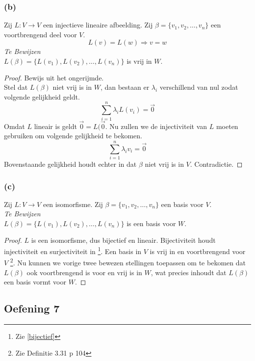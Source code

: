 \documentclass[lineaire_algebra_oplossingen.tex]{subfiles}
\begin{document}
\subsubsection*{(b)}
Zij $L: V \rightarrow V$ een injectieve lineaire afbeelding. Zij $\beta = \{v_1,v_2,\ldots,v_n\}$ een voortbrengend deel voor $V$.
\[
L(v) = L(w) \Rightarrow v = w
\]
\emph{Te Bewijzen}\\
$L(\beta) = \{L(v_1),L(v_2),\ldots,L(v_n)\}$ is vrij in $W$.
\begin{proof}
Bewijs uit het ongerijmde.\\
Stel dat $L(\beta)$ niet vrij is in $W$, dan bestaan er $\lambda_i$ verschillend van nul zodat volgende gelijkheid geldt.
\[
\sum_{i=1}^n \lambda_i L(v_i) = \vec{0}
\]
Omdat $L$ lineair is geldt $\vec{0} = L(\vec{0}$. Nu zullen we de injectiviteit van $L$ moeten gebruiken om volgende gelijkheid te bekomen.
\[
\sum_{i=1}^n \lambda_i v_i = \vec{0}
\]
Bovenstaande gelijkheid houdt echter in dat $\beta$ niet vrij is in $V$. Contradictie.
\end{proof}

\subsubsection*{(c)}
Zij $L: V \rightarrow V$ een isomorfisme. Zij $\beta = \{v_1,v_2,\ldots,v_n\}$ een basis voor $V$.\\
\emph{Te Bewijzen}\\
$L(\beta) = \{L(v_1),L(v_2),\ldots,L(v_n)\}$ is een basis voor $W$.
\begin{proof}
$L$ is een isomorfisme, dus bijectief en lineair. Bijectiviteit houdt injectiviteit en surjectiviteit in \footnote{Zie \ref{bijectief}}. Een basis in $V$ is vrij in en voortbrengend voor $V$ \footnote{Zie Definitie 3.31 p 104}. Nu kunnen we vorige twee bewezen stellingen toepassen om te bekomen dat $L(\beta)$ ook voortbrengend is voor en vrij is in $W$, wat precies inhoudt dat $L(\beta)$ een basis vormt voor $W$.
\end{proof}

\subsection{Oefening 7}
\end{document}
